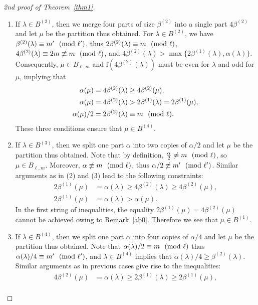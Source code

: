 \documentclass[12pt,reqno]{amsart}
\numberwithin{equation}{section}
\newcommand{\f}{\mathrm{f}}
\newcommand{\tpmod}[1]{\mkern 12mu(\textup{mod}\mkern 6mu #1)}
\begin{document}
\begin{proof}[2nd proof of Theorem~\ref{thm1}]
\begin{enumerate}
\begin{align*}
		\alpha(\mu)/2 &=\beta^{(1)}(\lambda)\not\equiv m'\tpmod{\ell'}.
	\end{align*}
	These three conditions ensure that $\mu\in B^{(3)}$.
	\item If $\lambda\in B^{(2)}$, then we merge four parts of size $\beta^{(2)}$ into a single part $4\beta^{(2)}$ and let $\mu$ be the partition thus obtained. For $\lambda\in B^{(2)}$, we have $\beta^{(2)}(\lambda)\equiv m'\tpmod{\ell'}$, thus $2\beta^{(2)}(\lambda)\equiv m\tpmod{\ell}$, $4\beta^{(2)}(\lambda)\equiv 2m \not\equiv m\tpmod{\ell}$, and $4\beta^{(2)}(\lambda)>\max\{2\beta^{(1)}(\lambda),\alpha(\lambda)\}$. Consequently, $\mu\in B_{\ell,m}$ and $\f(4\beta^{(2)}(\lambda))$ must be even for $\lambda$ and odd for $\mu$, implying that
	\begin{align*}
		\alpha(\mu) &=4\beta^{(2)}(\lambda)\geq4\beta^{(2)}(\mu),\\
		\alpha(\mu) &=4\beta^{(2)}(\lambda)>2\beta^{(1)}(\lambda)=2\beta^{(1)}(\mu),\\
		\alpha(\mu)/2 &=2\beta^{(2)}(\lambda) \equiv m\tpmod{\ell}.
	\end{align*}
	These three conditions ensure that $\mu\in B^{(4)}$.
	\item If $\lambda\in B^{(3)}$, then we split one part $\alpha$ into two copies of $\alpha/2$ and let $\mu$ be the partition thus obtained. Note that by definition, $\frac{\alpha}{2}\not\equiv m \tpmod{\ell}$, so $\mu \in B_{\ell,m}$. Moreover, $\alpha\not\equiv m\tpmod{\ell}$, thus $\alpha/2\not\equiv m'\tpmod{\ell'}$. Similar arguments as in (2) and (3) lead to the following constraints:
	\begin{align*}
		2\beta^{(1)}(\mu) &=\alpha(\lambda)\ge 4\beta^{(2)}(\lambda)\ge 4\beta^{(2)}(\mu),\\
		2\beta^{(1)}(\mu) &=\alpha(\lambda)>\alpha(\mu).
	\end{align*}
	In the first string of inequalities, the equality $2\beta^{(1)}(\mu)=4\beta^{(2)}(\mu)$ cannot be achieved owing to Remark~\ref{ab0}. Therefore we see that $\mu\in B^{(1)}$.
	\item If $\lambda\in B^{(4)}$, then we split one part $\alpha$ into four copies of $\alpha/4$ and let $\mu$ be the partition thus obtained. Note that $\alpha(\lambda)/2\equiv m\tpmod{\ell}$ thus $\alpha(\lambda)/4\equiv m'\tpmod{\ell'}$, and $\lambda\in B^{(4)}$ implies that $\alpha(\lambda)/4\ge \beta^{(2)}(\lambda)$. Similar arguments as in previous cases give rise to the inequalities:
	\begin{align*}
		4\beta^{(2)}(\mu) &=\alpha(\lambda)\ge 2\beta^{(1)}(\lambda)\ge 2\beta^{(1)}(\mu),\\

\end{align*}
\end{enumerate}
\end{proof}
\end{document}
